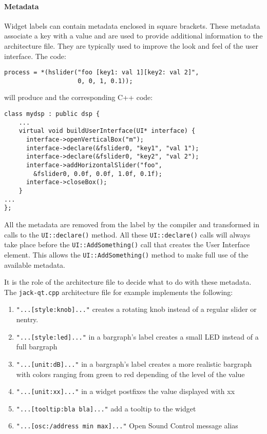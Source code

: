 \paragraph{Metadata}
Widget labels can contain metadata enclosed in square brackets. These metadata associate a key with a value and are used to provide additional information to the architecture file.  They are typically used to improve the look and feel of the user interface.
The \faust code:
\begin{lstlisting}
process = *(hslider("foo [key1: val 1][key2: val 2]", 
					0, 0, 1, 0.1));
\end{lstlisting}

will produce and the corresponding C++ code:

\begin{lstlisting}
class mydsp : public dsp {
	...
	virtual void buildUserInterface(UI* interface) {
	  interface->openVerticalBox("m");
	  interface->declare(&fslider0, "key1", "val 1");
	  interface->declare(&fslider0, "key2", "val 2");
	  interface->addHorizontalSlider("foo", 
	  	&fslider0, 0.0f, 0.0f, 1.0f, 0.1f);
	  interface->closeBox();
	}
...
};
\end{lstlisting}

All the metadata are removed from the label by the compiler and
transformed in calls to the \lstinline'UI::declare()' method. All these
\lstinline'UI::declare()' calls will always take place before the \lstinline'UI::AddSomething()'
call that creates the User Interface element. This allows the
\lstinline'UI::AddSomething()'  method to make full use of the available metadata.

It is the role of the architecture file to decide what to do with these
metadata. The \lstinline'jack-qt.cpp' architecture file for example implements the
following:
\begin{enumerate}
	\item \lstinline'"...[style:knob]..."' creates a rotating knob instead of a regular
	      slider or nentry.
	\item \lstinline'"...[style:led]..."' in a bargraph's label creates a small LED instead
	      of a full bargraph
	\item \lstinline'"...[unit:dB]..."' in a bargraph's label creates a more realistic
	      bargraph with colors ranging from green to red depending of the level of
	      the value
	\item \lstinline'"...[unit:xx]..."' in a widget postfixes the value displayed with xx
	\item \lstinline'"...[tooltip:bla bla]..."' add a tooltip to the widget
	\item \lstinline'"...[osc:/address min max]..."' Open Sound Control message alias
\end{enumerate}

